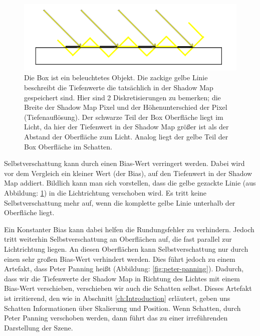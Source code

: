 \begin{figure}[H]
	\begin{center}
    \includegraphics[width=1\textwidth]{res/img/shadow-acne3/image.png}
    \caption{Die Box ist ein beleuchtetes Objekt. 
      Die zackige gelbe Linie beschreibt die Tiefenwerte die tatsächlich in der Shadow Map gespeichert sind.
      Hier sind 2 Diskretisierungen zu bemerken; 
      die Breite der Shadow Map Pixel und der Höhenunterschied der Pixel (Tiefenauflösung).
      Der schwarze Teil der Box Oberfläche liegt im Licht, 
      da hier der Tiefenwert in der Shadow Map größer ist als der Abstand der Oberfläche zum Licht.
      Analog liegt der gelbe Teil der Box Oberfläche im Schatten.
    }
	  \label{fig:shadow-acne-illu}
	\end{center}
\end{figure}

Selbstverschattung kann durch einen Bias-Wert verringert werden.
Dabei wird vor dem Vergleich ein kleiner Wert (der Bias), auf den Tiefenwert in der Shadow Map addiert.
Bildlich kann man sich vorstellen, dass die gelbe gezackte Linie
(aus Abbildung: \ref{fig:shadow-acne-illu}) in die Lichtrichtung verschoben wird.
Es tritt keine Selbstverschattung mehr auf, wenn die komplette gelbe Linie unterhalb der Oberfläche liegt.
\par
Ein Konstanter Bias kann dabei helfen die Rundungsfehler zu verhindern.
Jedoch tritt weiterhin Selbstverschattung an Oberflächen auf, die fast parallel zur Lichtrichtung liegen.
An diesen Oberflächen kann Selbstverschattung nur durch einen sehr großen Bias-Wert verhindert werden.
Dies führt jedoch zu einem Artefakt, dass Peter Panning heißt (Abbildung: \ref{fig:peter-panning}).
Dadurch, dass wir die Tiefenwerte der Shadow Map in Richtung des Lichtes mit einem Bias-Wert verschieben,
verschieben wir auch die Schatten selbst.
Dieses Artefakt ist irritierend, den wie in Abschnitt \ref{ch:Introduction} erläutert, geben uns Schatten Informationen
über Skalierung und Position. Wenn Schatten, durch Peter Panning verschoben werden, dann führt das zu einer irreführenden Darstellung der Szene.


